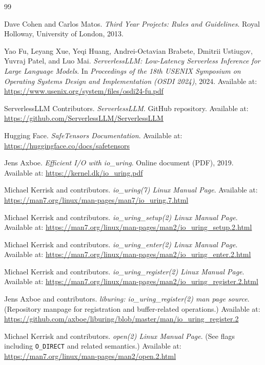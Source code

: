 \documentclass[]{final_report}
\begin{document}
\begin{thebibliography}{99}

Dave Cohen and Carlos Matos.
\emph{Third Year Projects: Rules and Guidelines}.
Royal Holloway, University of London, 2013.

Yao Fu, Leyang Xue, Yeqi Huang, Andrei-Octavian Brabete, Dmitrii Ustiugov, Yuvraj Patel, and Luo Mai.
\emph{ServerlessLLM: Low-Latency Serverless Inference for Large Language Models}.
In \emph{Proceedings of the 18th USENIX Symposium on Operating Systems Design and Implementation (OSDI 2024)}, 2024.
Available at: \url{https://www.usenix.org/system/files/osdi24-fu.pdf}

ServerlessLLM Contributors.
\emph{ServerlessLLM}.
GitHub repository.
Available at: \url{https://github.com/ServerlessLLM/ServerlessLLM}

Hugging Face.
\emph{SafeTensors Documentation}.
Available at: \url{https://huggingface.co/docs/safetensors}

Jens Axboe.
\emph{Efficient I/O with io\_uring}.
Online document (PDF), 2019.
Available at: \url{https://kernel.dk/io_uring.pdf}

Michael Kerrisk and contributors.
\emph{io\_uring(7) Linux Manual Page}.
Available at: \url{https://man7.org/linux/man-pages/man7/io_uring.7.html}

Michael Kerrisk and contributors.
\emph{io\_uring\_setup(2) Linux Manual Page}.
Available at: \url{https://man7.org/linux/man-pages/man2/io_uring_setup.2.html}

Michael Kerrisk and contributors.
\emph{io\_uring\_enter(2) Linux Manual Page}.
Available at: \url{https://man7.org/linux/man-pages/man2/io_uring_enter.2.html}

Michael Kerrisk and contributors.
\emph{io\_uring\_register(2) Linux Manual Page}.
Available at: \url{https://man7.org/linux/man-pages/man2/io_uring_register.2.html}

Jens Axboe and contributors.
\emph{liburing: io\_uring\_register(2) man page source}.
(Repository manpage for registration and buffer-related operations.)
Available at: \url{https://github.com/axboe/liburing/blob/master/man/io_uring_register.2}

Michael Kerrisk and contributors.
\emph{open(2) Linux Manual Page}.
(See flags including \texttt{O\_DIRECT} and related semantics.)
Available at: \url{https://man7.org/linux/man-pages/man2/open.2.html}


\end{thebibliography}
\end{document}
